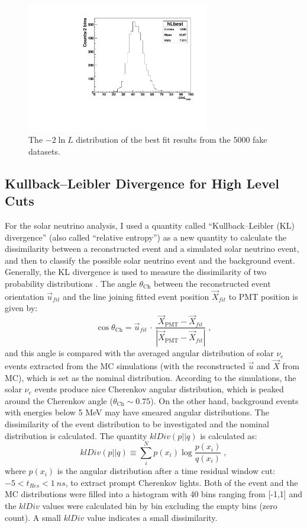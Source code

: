 \begin{figure}[!htb]
	\centering
	\includegraphics[width=8cm]{ensemble_lnLbest.pdf}
	\caption{The $-2\ln L$ distribution of the best fit results from the 5000 fake datasets. \label{poisson_fitLnL}}
\end{figure}

\subsection{Kullback–Leibler Divergence for High Level Cuts}

For the solar neutrino analysis, I used a quantity called ``Kullback–Leibler (KL) divergence'' (also called ``relative entropy'') as a new quantity to calculate the dissimilarity between a reconstructed event and a simulated solar neutrino event, and then to classify the possible solar neutrino event and the background event. Generally, the KL divergence is used to measure the dissimilarity of two probability distributions \cite{murphy2012machine}. The angle $\theta_\mathrm{Ch}$ between the reconstructed event orientation $\vec{u}_{fit}$ and the line joining fitted event position $\vec{X}_{fit}$ to PMT position is given by:
\begin{equation*}
\cos\theta_\mathrm{Ch}=\vec{u}_{fit} \, \cdot \, \frac{\vec{X}_\mathrm{PMT}-\vec{X}_{fit}}{|\vec{X}_\mathrm{PMT}-\vec{X}_{fit}|} \; ,
\end{equation*}
and this angle is compared with the averaged angular distribution of solar $\nu_e$ events extracted from the MC simulations (with the reconstructed $\vec{u}$ and $\vec{X}$ from MC), which is set as the nominal distribution. According to the simulations, the solar $\nu_e$ events produce nice Cherenkov angular distribution, which is peaked around the Cherenkov angle ($\theta_\mathrm{Ch}\sim 0.75$). On the other hand, background events with energies below 5 MeV may have smeared angular distributions. The dissimilarity of the event distribution to be investigated and the nominal distribution is calculated. The quantity $klDiv(p||q)$ is calculated as: 
\begin{equation}\label{eq:kldiv}
klDiv(p||q) \equiv \sum_{i}^N p(x_i)\log{\frac{p(x_i)}{q(x_i)}}\; ,
\end{equation}
where $p(x_i)$ is the angular distribution after a time residual window cut: $-5<t_{Res}<1~ns$, to extract prompt Cherenkov lights. Both of the event and the MC distributions were filled into a histogram with 40 bins ranging from [-1,1] and the $klDiv$ values were calculated bin by bin excluding the empty bins (zero count). A small $klDiv$ value indicates a small dissimilarity.

